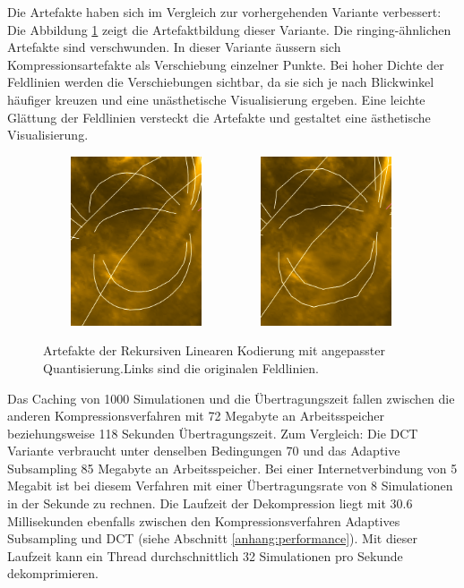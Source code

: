 Die Artefakte haben sich im Vergleich zur vorhergehenden Variante verbessert: Die Abbildung \ref{resultate:loesung2:adaptive:median_extra:artefakte} zeigt die Artefaktbildung dieser Variante. Die ringing-ähnlichen Artefakte sind verschwunden. In dieser Variante äussern sich Kompressionsartefakte als Verschiebung einzelner Punkte. Bei hoher Dichte der Feldlinien werden die Verschiebungen sichtbar, da sie sich je nach Blickwinkel häufiger kreuzen und eine unästhetische Visualisierung ergeben. Eine leichte Glättung der Feldlinien versteckt die Artefakte und gestaltet eine ästhetische Visualisierung.

\begin{figure}[!htbp]
	\center
		\includegraphics[width=0.49\textwidth,height=5cm,keepaspectratio]{./pictures/resultate/loesung2/variante3/no_artifacts.png}
	\includegraphics[width=0.49\textwidth,height=5cm,keepaspectratio]{./pictures/resultate/loesung2/variante3/artifacts_extra.png}
	\caption{Artefakte der Rekursiven Linearen Kodierung mit angepasster Quantisierung.Links sind die originalen Feldlinien.}
	\label{resultate:loesung2:adaptive:median_extra:artefakte}
\end{figure}

Das Caching von 1000 Simulationen und die Übertragungszeit fallen zwischen die anderen Kompressionsverfahren mit 72 Megabyte an Arbeitsspeicher beziehungsweise 118 Sekunden Übertragungszeit. Zum Vergleich: Die DCT Variante verbraucht unter denselben Bedingungen 70 und das Adaptive Subsampling 85 Megabyte an Arbeitsspeicher. Bei einer Internetverbindung von 5 Megabit ist bei diesem Verfahren mit einer Übertragungsrate von 8 Simulationen in der Sekunde zu rechnen. Die Laufzeit der Dekompression liegt mit 30.6 Millisekunden ebenfalls zwischen den Kompressionsverfahren Adaptives Subsampling und DCT (siehe Abschnitt \ref{anhang:performance}). Mit dieser Laufzeit kann ein Thread durchschnittlich 32 Simulationen pro Sekunde dekomprimieren.